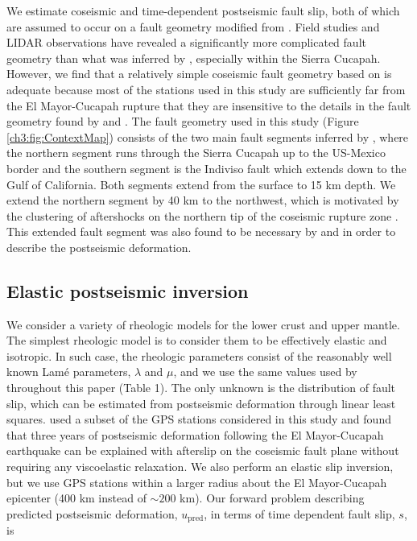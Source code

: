 We estimate coseismic and time-dependent postseismic fault slip, both of which are assumed to occur on a fault geometry modified from \citet{Wei2011}.  Field studies \citep{Fletcher2014} and LIDAR observations \citep{Oskin2012} have revealed a significantly more complicated fault geometry than what was inferred by \citet{Wei2011}, especially within the Sierra Cucapah.  However, we find that a relatively simple coseismic fault geometry based on \citep{Wei2011} is adequate because most of the stations used in this study are sufficiently far from the El Mayor-Cucapah rupture that they are insensitive to the details in the fault geometry found by \citet{Fletcher2014} and \citet{Oskin2012}.  The fault geometry used in this study (Figure \ref{ch3:fig:ContextMap}) consists of the two main fault segments inferred by \citet{Wei2011}, where the northern segment runs through the Sierra Cucapah up to the US-Mexico border and the southern segment is the Indiviso fault which extends down to the Gulf of California. Both segments extend from the surface to 15 km depth.  We extend the northern segment by 40 km to the northwest, which is motivated by the clustering of aftershocks on the northern tip of the coseismic rupture zone \citep{Hauksson2011,Kroll2013}.  This extended fault segment was also found to be necessary by \citet{Rollins2015} and \citet{Pollitz2012} in order to describe the postseismic deformation. 

\subsection{Elastic postseismic inversion}\label{ch3:sec:ElasticInversion}    
We consider a variety of rheologic models for the lower crust and upper mantle. The simplest rheologic model is to consider them to be effectively elastic and isotropic.  In such case, the rheologic parameters consist of the reasonably well known Lam\'e parameters, $\lambda$ and $\mu$, and we use the same values used by \citet{Wei2011} throughout this paper (Table 1).  The only unknown is the distribution of fault slip, which can be estimated from postseismic deformation through linear least squares.  \citet{Rollins2015} used a subset of the GPS stations considered in this study and found that three years of postseismic deformation following the El Mayor-Cucapah earthquake can be explained with afterslip on the coseismic fault plane without requiring any viscoelastic relaxation. We also perform an elastic slip inversion, but we use GPS stations within a larger radius about the El Mayor-Cucapah epicenter (400 km instead of ${\sim}200$ km). Our forward problem describing predicted postseismic deformation, $u_\mathrm{pred}$, in terms of time dependent fault slip, $s$, is

